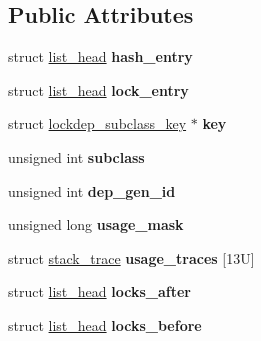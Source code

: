 \subsection*{Public Attributes}
\begin{DoxyCompactItemize}
\item 
\hypertarget{structlock__class_a81fe763be09ca3fd092437356be5bbcc}{}struct \hyperlink{structlist__head}{list\+\_\+head} {\bfseries hash\+\_\+entry}\label{structlock__class_a81fe763be09ca3fd092437356be5bbcc}

\item 
\hypertarget{structlock__class_a485790e27425d8d46c70f0aebbacaad8}{}struct \hyperlink{structlist__head}{list\+\_\+head} {\bfseries lock\+\_\+entry}\label{structlock__class_a485790e27425d8d46c70f0aebbacaad8}

\item 
\hypertarget{structlock__class_a68ff47e7503928cbbe456e6e33112058}{}struct \hyperlink{structlockdep__subclass__key}{lockdep\+\_\+subclass\+\_\+key} $\ast$ {\bfseries key}\label{structlock__class_a68ff47e7503928cbbe456e6e33112058}

\item 
\hypertarget{structlock__class_a9cd2eeb3388a87818cd81f790aacff80}{}unsigned int {\bfseries subclass}\label{structlock__class_a9cd2eeb3388a87818cd81f790aacff80}

\item 
\hypertarget{structlock__class_a63dad022280265bf98f5fa363e6f85ea}{}unsigned int {\bfseries dep\+\_\+gen\+\_\+id}\label{structlock__class_a63dad022280265bf98f5fa363e6f85ea}

\item 
\hypertarget{structlock__class_ace7012a587ce7f117a7bafcaf252830a}{}unsigned long {\bfseries usage\+\_\+mask}\label{structlock__class_ace7012a587ce7f117a7bafcaf252830a}

\item 
\hypertarget{structlock__class_ac1d475afac53b186e3ee0d7f7008dc36}{}struct \hyperlink{structstack__trace}{stack\+\_\+trace} {\bfseries usage\+\_\+traces} \mbox{[}13\+U\mbox{]}\label{structlock__class_ac1d475afac53b186e3ee0d7f7008dc36}

\item 
\hypertarget{structlock__class_add6d2b4f9431fa70e8dee6a256675251}{}struct \hyperlink{structlist__head}{list\+\_\+head} {\bfseries locks\+\_\+after}\label{structlock__class_add6d2b4f9431fa70e8dee6a256675251}

\item 
\hypertarget{structlock__class_a67734599748889be6ae04ccbc5f96f7c}{}struct \hyperlink{structlist__head}{list\+\_\+head} {\bfseries locks\+\_\+before}\label{structlock__class_a67734599748889be6ae04ccbc5f96f7c}


\end{DoxyCompactItemize}
